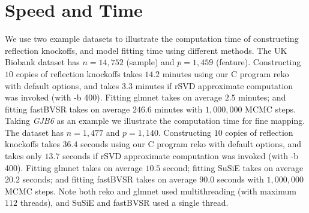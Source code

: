 \documentclass[12pt,Times]{article}
\begin{document}
\section{Speed and Time}
We use two example datasets to illustrate the computation time of constructing reflection knockoffs, and model fitting time using different methods. The UK Biobank dataset has $n=14,752$ (sample) and $p=1,459$ (feature). Constructing $10$ copies of reflection knockoffs takes $14.2$ minutes using our C program reko with default options, and takes $3.3$ minutes if rSVD approximate computation was invoked (with -b 400). Fitting glmnet takes on average $2.5$ minutes; and fitting fastBVSR takes on average $246.6$ minutes with $1,000,000$ MCMC steps.  
Taking \emph{GJB6} as an example we illustrate the computation time for fine mapping. The dataset has $n=1,477$ and $p=1,140$. Constructing $10$ copies of reflection knockoffs takes $36.4$ seconds using our C program reko with default options, and takes only $13.7$ seconds if rSVD approximate computation was invoked (with -b 400).  Fitting glmnet takes on average $10.5$ second; fitting SuSiE takes on average $20.2$ seconds; and fitting fastBVSR takes on average $90.0$ seconds with $1,000,000$ MCMC steps.  Note both reko and glmnet used multithreading (with maximum $112$ threads), and SuSiE and fastBVSR used a single thread. 





\label{lastpage}


\end{document}
